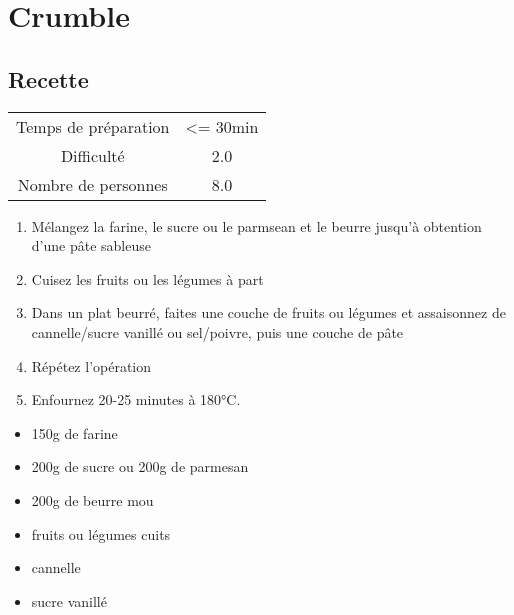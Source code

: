 \newpage
\section{Crumble}
    \label{sec:Crumble}
    \subsection{Recette}
    \vspace{1cm}


    \begin{center}
        \begin{tabular}{c|c}
            Temps de préparation & <= 30min \\
            Difficulté & 2.0 \\
            Nombre de personnes & 8.0 
        \end{tabular}
    \end{center}{}

    \vspace{1cm}
    \hline
    \vspace{1cm}

    \begin{minipage}{.7\textwidth}
        \begin{enumerate}
            \item Mélangez la farine, le sucre ou le parmsean et le beurre jusqu'à obtention d'une pâte sableuse
	    \item Cuisez les fruits ou les légumes à part
	    \item Dans un plat beurré, faites une couche de fruits ou légumes et assaisonnez de cannelle/sucre vanillé ou sel/poivre, puis une couche de pâte
	    \item Répétez l'opération
	    \item Enfournez 20-25 minutes à 180°C.

        \end{enumerate}
    \end{minipage}
    \begin{minipage}{.3\textwidth}
        \begin{flushleft}
        \begin{itemize}
            \item 150g de farine
	    \item 200g de sucre ou 200g de parmesan
	    \item 200g de beurre mou
	    \item fruits ou légumes cuits
	    \item cannelle
	    \item sucre vanillé

        \end{itemize}
        \end{flushleft}
    \end{minipage}
    
